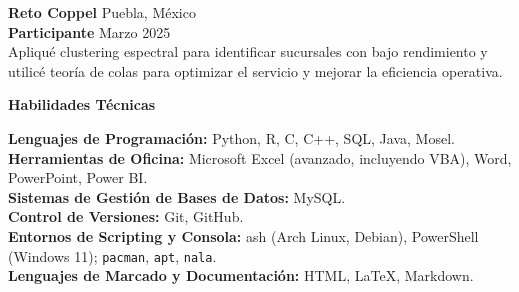 \documentclass[9pt]{extarticle} %
\begin{document}
\textbf{Reto Coppel} \hfill Puebla, México\\  
\textbf{Participante} \hfill Marzo 2025\\  
Apliqué clustering espectral para identificar sucursales con bajo rendimiento y utilicé teoría de colas para optimizar el servicio y mejorar la eficiencia operativa.

\begin{center}  
    \vspace{1ex}  
    \textbf{Habilidades Técnicas}  
    \vspace{-1ex}  
\end{center}

\textbf{Lenguajes de Programación:} Python, R, C, C++, SQL, Java, Mosel.\\  
\textbf{Herramientas de Oficina:} Microsoft Excel (avanzado, incluyendo VBA), Word, PowerPoint, Power BI.\\  
\textbf{Sistemas de Gestión de Bases de Datos:} MySQL.\\  
\textbf{Control de Versiones:} Git, GitHub.\\  
\textbf{Entornos de Scripting y Consola:} ash (Arch Linux, Debian), PowerShell (Windows 11); \texttt{pacman}, \texttt{apt}, \texttt{nala}.\\
\textbf{Lenguajes de Marcado y Documentación:} HTML, LaTeX, Markdown.\\
\end{document}
